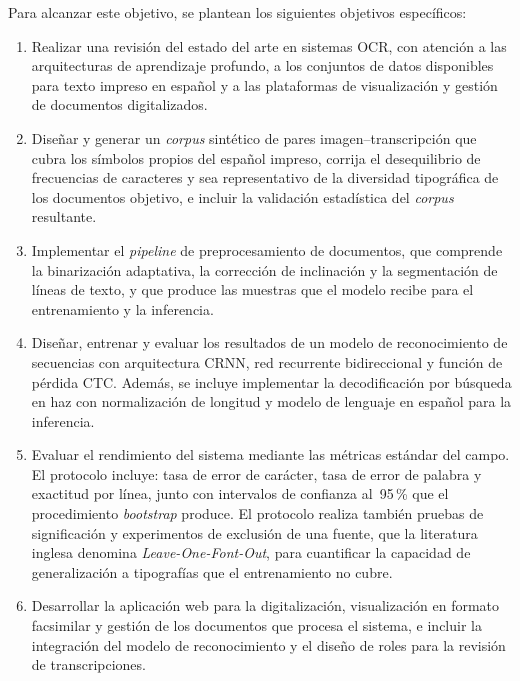 Para alcanzar este objetivo, se plantean los siguientes objetivos específicos:

\begin{enumerate}
	\item Realizar una revisión del estado del arte en sistemas OCR, con atención a las arquitecturas de aprendizaje profundo, a los conjuntos de datos disponibles para texto impreso en español y a las plataformas de visualización y gestión de documentos digitalizados.
	
	\item Diseñar y generar un \textit{corpus} sintético de pares imagen--transcripción que cubra los símbolos propios del español impreso, corrija el desequilibrio de frecuencias de caracteres y sea representativo de la diversidad tipográfica de los documentos objetivo, e incluir la validación estadística del \textit{corpus} resultante.
	
	\item Implementar el \textit{pipeline} de preprocesamiento de documentos, que comprende la binarización adaptativa, la corrección de inclinación y la segmentación de líneas de texto, y que produce las muestras que el modelo recibe para el entrenamiento y la inferencia.
	
	\item Diseñar, entrenar y evaluar los resultados de un modelo de reconocimiento de secuencias con arquitectura CRNN, red recurrente bidireccional y función de pérdida CTC. Además, se incluye implementar la decodificación por búsqueda en haz con normalización de longitud y modelo de lenguaje en español para la inferencia.
	
	\item Evaluar el rendimiento del sistema mediante las métricas estándar del campo. El protocolo incluye: tasa de error de carácter, tasa de error de palabra y exactitud por línea, junto con intervalos de confianza al~95\,\% que el procedimiento \textit{bootstrap} produce. El protocolo realiza también pruebas de significación y experimentos de exclusión de una fuente, que la literatura inglesa denomina \textit{Leave-One-Font-Out}, para cuantificar la capacidad de generalización a tipografías que el entrenamiento no cubre.
	
	\item Desarrollar la aplicación web para la digitalización, visualización en formato facsimilar y gestión de los documentos que procesa el sistema, e incluir la integración del modelo de reconocimiento y el diseño de roles para la revisión de transcripciones.
\end{enumerate}

